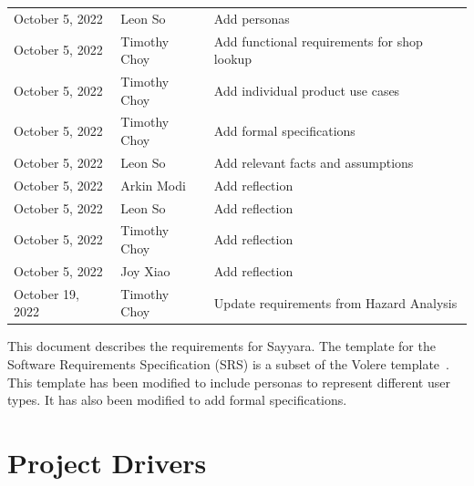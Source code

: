 \documentclass[12pt]{article}
\begin{document}
\begin{table}[H]
\begin{tabularx}{\textwidth}{llX}
		October 5, 2022    & Leon So               & Add personas                                                                       \\
		October 5, 2022    & Timothy Choy          & Add functional requirements for shop lookup                                        \\
		October 5, 2022    & Timothy Choy          & Add individual product use cases                                                   \\
		October 5, 2022    & Timothy Choy          & Add formal specifications                                                          \\
		October 5, 2022    & Leon So               & Add relevant facts and assumptions                                                 \\
		October 5, 2022    & Arkin Modi            & Add reflection                                                                     \\
		October 5, 2022    & Leon So               & Add reflection                                                                     \\
		October 5, 2022    & Timothy Choy          & Add reflection                                                                     \\
		October 5, 2022    & Joy Xiao              & Add reflection                                                                     \\
		October 19, 2022   & Timothy Choy          & Update requirements from Hazard Analysis                                           \\
		\bottomrule
	\end{tabularx}
\end{table}

\newpage


This document describes the requirements for Sayyara. The template for the Software Requirements
Specification (SRS) is a subset of the Volere template~\citep{RobertsonAndRobertson2012}. This
template has been modified to include personas to represent different user types. It has also been
modified to add formal specifications.

\section{Project Drivers}
\end{document}
